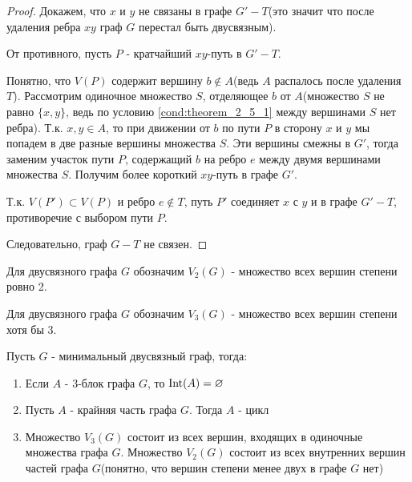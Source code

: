 \begin{proof}
	Докажем, что  $x$ и  $y$ не связаны в графе  $G' - T$(это значит что после удаления ребра $xy$ граф  $G$ перестал быть двусвязным).

	От противного, пусть $P$ - кратчайший  $xy$-путь в  $G' - T$.

	Понятно, что  $V(P)$ содержит вершину $b \not \in A$(ведь $A$ распалось после удаления  $T$).
	Рассмотрим одиночное множество $S$, отделяющее  $b$ от  $A$(множество $S$ не равно  $\{x, y\}$, ведь по условию \eqref{cond:theorem_2_5_1} между вершинами  $S$ нет ребра).
	Т.к. $x, y \in A$, то при движении от  $b$ по пути  $P$ в сторону $x$ и  $y$ мы попадем в две разные вершины множества  $S$.
	Эти вершины смежны в  $G'$, тогда заменим участок пути  $P$, содержащий  $b$ на ребро  $e$ между двумя вершинами множества  $S$.
	Получим более короткий  $xy$-путь в графе $G'$.

	Т.к. $V(P') \subset V(P)$ и ребро  $e \not \in T$, путь $P'$ соединяет  $x$ с  $y$ и в графе  $G' - T$, противоречие с выбором пути  $P$.

	Следовательно, граф  $G - T$ не связен.


\end{proof}

\begin{df}[$V_2(G)$]
	Для двусвязного графа $G$ обозначим  $V_2(G)$ - множество всех вершин степени ровно 2.
\end{df}

\begin{df}[$V_3(G)$]
	Для двусвязного графа $G$ обозначим  $V_3(G)$ - множество всех вершин степени хотя бы 3.
\end{df}

\begin{crly}[Следствие 2.5] \label{corollary:2_5}
	Пусть $G$ - минимальный двусвязный граф, тогда:

	\begin{enumerate}
		\item Если $A$ - 3-блок графа  $G$, то  $\operatorname{Int}(A) = \varnothing$
		\item Пусть  $A$ - крайняя часть графа  $G$. Тогда  $A$ - цикл 
		\item Множество  $V_3(G)$ состоит из всех вершин, входящих в одиночные множества графа  $G$.
		Множество  $V_2(G)$ состоит из всех внутренних вершин частей графа  $G$(понятно, что вершин степени менее двух в графе $G$ нет)
	\end{enumerate}

\end{crly}

